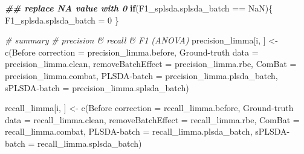 \documentclass[
]{book}
\newenvironment{Shaded}{\begin{snugshade}}{\end{snugshade}}
\newcommand{\AttributeTok}[1]{\textcolor[rgb]{0.77,0.63,0.00}{#1}}
\newcommand{\CommentTok}[1]{\textcolor[rgb]{0.56,0.35,0.01}{\textit{#1}}}
\newcommand{\ControlFlowTok}[1]{\textcolor[rgb]{0.13,0.29,0.53}{\textbf{#1}}}
\newcommand{\DecValTok}[1]{\textcolor[rgb]{0.00,0.00,0.81}{#1}}
\newcommand{\DocumentationTok}[1]{\textcolor[rgb]{0.56,0.35,0.01}{\textbf{\textit{#1}}}}
\newcommand{\FunctionTok}[1]{\textcolor[rgb]{0.00,0.00,0.00}{#1}}
\newcommand{\NormalTok}[1]{#1}
\newcommand{\OtherTok}[1]{\textcolor[rgb]{0.56,0.35,0.01}{#1}}
\newcommand{\SpecialCharTok}[1]{\textcolor[rgb]{0.00,0.00,0.00}{#1}}
\newcommand{\StringTok}[1]{\textcolor[rgb]{0.31,0.60,0.02}{#1}}
\begin{document}
\begin{Shaded}
\begin{Highlighting}[]
  \DocumentationTok{\#\# replace NA value with 0}
  \ControlFlowTok{if}\NormalTok{(F1\_splsda.splsda\_batch }\SpecialCharTok{==} \StringTok{\textquotesingle{}NaN\textquotesingle{}}\NormalTok{)\{}
\NormalTok{    F1\_splsda.splsda\_batch }\OtherTok{=} \DecValTok{0}
\NormalTok{  \}}
  
  \CommentTok{\# summary}
  \CommentTok{\# precision \& recall \& F1 (ANOVA)}
\NormalTok{  precision\_limma[i, ] }\OtherTok{\textless{}{-}} \FunctionTok{c}\NormalTok{(}\StringTok{\textasciigrave{}}\AttributeTok{Before correction}\StringTok{\textasciigrave{}} \OtherTok{=}\NormalTok{ precision\_limma.before, }
                            \StringTok{\textasciigrave{}}\AttributeTok{Ground{-}truth data}\StringTok{\textasciigrave{}} \OtherTok{=}\NormalTok{ precision\_limma.clean,}
                            \StringTok{\textasciigrave{}}\AttributeTok{removeBatchEffect}\StringTok{\textasciigrave{}} \OtherTok{=}\NormalTok{ precision\_limma.rbe,}
                            \AttributeTok{ComBat =}\NormalTok{ precision\_limma.combat,}
                            \StringTok{\textasciigrave{}}\AttributeTok{PLSDA{-}batch}\StringTok{\textasciigrave{}} \OtherTok{=}\NormalTok{ precision\_limma.plsda\_batch,}
                            \StringTok{\textasciigrave{}}\AttributeTok{sPLSDA{-}batch}\StringTok{\textasciigrave{}} \OtherTok{=}\NormalTok{ precision\_limma.splsda\_batch)}
  
\NormalTok{  recall\_limma[i, ] }\OtherTok{\textless{}{-}} \FunctionTok{c}\NormalTok{(}\StringTok{\textasciigrave{}}\AttributeTok{Before correction}\StringTok{\textasciigrave{}} \OtherTok{=}\NormalTok{ recall\_limma.before, }
                         \StringTok{\textasciigrave{}}\AttributeTok{Ground{-}truth data}\StringTok{\textasciigrave{}} \OtherTok{=}\NormalTok{ recall\_limma.clean,}
                         \StringTok{\textasciigrave{}}\AttributeTok{removeBatchEffect}\StringTok{\textasciigrave{}} \OtherTok{=}\NormalTok{ recall\_limma.rbe,}
                         \AttributeTok{ComBat =}\NormalTok{ recall\_limma.combat,}
                         \StringTok{\textasciigrave{}}\AttributeTok{PLSDA{-}batch}\StringTok{\textasciigrave{}} \OtherTok{=}\NormalTok{ recall\_limma.plsda\_batch,}
                         \StringTok{\textasciigrave{}}\AttributeTok{sPLSDA{-}batch}\StringTok{\textasciigrave{}} \OtherTok{=}\NormalTok{ recall\_limma.splsda\_batch)}
  

\end{Highlighting}
\end{Shaded}
\end{document}
